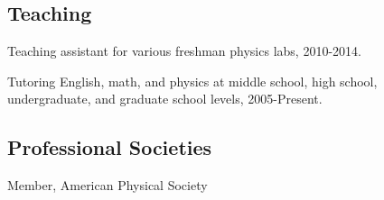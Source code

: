 \documentclass[letterpaper]{article}
\renewenvironment{itemize}{
\begin{list}{}{
\setlength{\leftmargin}{1.5em}
}
}{
\end{list}
}
\begin{document}
\subsection*{Teaching}
\begin{itemize}
\item Teaching assistant for various freshman physics labs, 2010-2014.
\item Tutoring English, math, and physics at middle school, high school, undergraduate, and graduate school levels, 2005-Present.
\end{itemize}

\subsection*{Professional Societies}
\begin{itemize}
\item Member, American Physical Society
\end{itemize}
\end{document}
